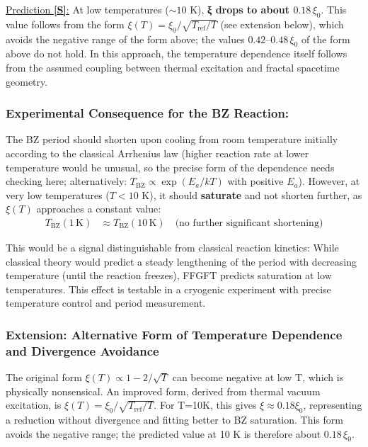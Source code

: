 	\underline{Prediction \textbf{[S]}:} At low temperatures ($\sim 10$ K), \textbf{ξ drops to about $0.18\,\xi_0$}. This value follows from the form $\xi(T) = \xi_0/\sqrt{T_{\text{ref}}/T}$ (see extension below), which avoids the negative range of the form above; the values $0.42$--$0.48\,\xi_0$ of the form above do not hold. In this approach, the temperature dependence itself follows from the assumed coupling between thermal excitation and fractal spacetime geometry.
	
	\subsubsection*{Experimental Consequence for the BZ Reaction:}
	
	The BZ period should shorten upon cooling from room temperature initially according to the classical Arrhenius law (higher reaction rate at lower temperature would be unusual, so the precise form of the dependence needs checking here; alternatively: $T_{\text{BZ}} \propto \exp(E_a/kT)$ with positive $E_a$). However, at very low temperatures ($T < 10$ K), it should \textbf{saturate} and not shorten further, as $\xi(T)$ approaches a constant value:
	\begin{align*}
		T_{\text{BZ}}(1 \, \text{K}) &\approx T_{\text{BZ}}(10 \, \text{K}) \quad \text{(no further significant shortening)}
	\end{align*}
	
	This would be a signal distinguishable from classical reaction kinetics: While classical theory would predict a steady lengthening of the period with decreasing temperature (until the reaction freezes), FFGFT predicts saturation at low temperatures. This effect is testable in a cryogenic experiment with precise temperature control and period measurement.
	
	\subsubsection*{Extension: Alternative Form of Temperature Dependence and Divergence Avoidance}
	The original form $\xi(T) \propto 1 - 2/\sqrt{T}$ can become negative at low T, which is physically nonsensical. An improved form, derived from thermal vacuum excitation, is $\xi(T) = \xi_0 / \sqrt{T_{\text{ref}}/T}$. For T=10K, this gives $\xi \approx 0.18 \xi_0$, representing a reduction without divergence and fitting better to BZ saturation. This form avoids the negative range; the predicted value at 10 K is therefore about $0.18\,\xi_0$.


